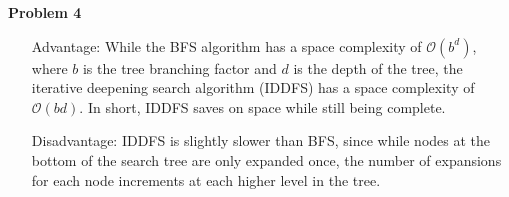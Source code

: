 \documentclass[11pt]{article}
\begin{document}
    \begin{center}
        \Large
        \textbf{Problem 4}
    \end{center}
    \normalsize
    \begin{enumerate}
        \item[Advantage:]
        While the BFS algorithm has a space complexity of $\mathcal{O}(b^d)$, where $b$ is the tree branching factor
        and $d$ is the depth of the tree, the iterative deepening search algorithm (IDDFS) has a space complexity of $\mathcal{O}(bd)$.
        In short, IDDFS saves on space while still being complete.
        \item[Disadvantage:] IDDFS is slightly slower than BFS, since while nodes at the bottom of the search
        tree are only expanded once, the number of expansions for each node increments at each higher level in the tree.
    \end{enumerate}
\end{document}
